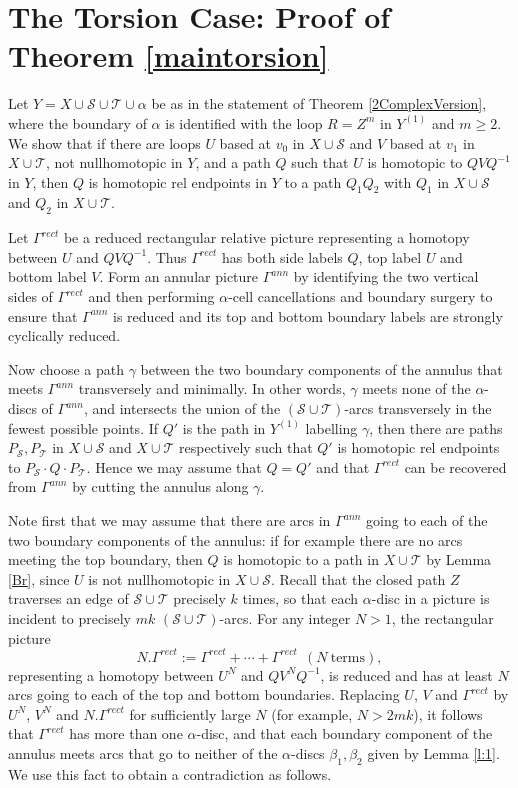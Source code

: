 \documentclass[12pt,a4paper]{amsart}
\def\G{\Gamma}
\def\a{\alpha}
\def\b{\beta}
\def\g{\gamma}
\def\cS{\mathcal{S}}
\def\cT{\mathcal{T}}
\begin{document}
\section{The Torsion Case: Proof of Theorem \ref{maintorsion}}\label{torsion}




	Let $Y=X\cup\cS\cup\cT\cup \alpha$ be as in the statement of 
 Theorem \ref{2ComplexVersion},
where the boundary of $\alpha$ is identified with the loop $R=Z^m$ in $Y^{(1)}$ and $m\ge 2$.
We show that if there are loops $U$ based at $v_0$ in $X\cup\cS$ and 
$V$ based at $v_1$ in $X\cup\cT$,
not nullhomotopic in $Y$, 
and a path $Q$ such that $U$ is homotopic to $QVQ^{-1}$ in $Y$,
then $Q$ is homotopic rel endpoints in $Y$ to a path $Q_1Q_2$ with $Q_1$ in $X\cup\cS$ and
$Q_2$ in $X\cup\cT$.

\smallskip
Let $\G^{rect}$ be a reduced rectangular relative picture representing 
a homotopy between $U$ and  $QVQ^{-1}$.  
Thus $\G^{rect}$ has both side labels $Q$, top label $U$ and bottom label $V$.   
Form an annular picture $\G^{ann}$ by identifying the two vertical sides of $\G^{rect}$ 
and then performing $\a$-cell cancellations and boundary surgery to ensure that $\G^{ann}$ is reduced 
and its top and bottom boundary labels are strongly cyclically reduced.

Now choose a path $\g$ between the two boundary components of the annulus that meets $\G^{ann}$ transversely and minimally.
In other words, $\g$ meets none of the $\a$-discs of $\G^{ann}$, and intersects the union of the $(\cS\cup\cT)$-arcs transversely in the fewest possible points.  
If $Q'$ is the path in $Y^{(1)}$ labelling $\g$, then there are paths $P_\cS,P_\cT$ in $X\cup\cS$ 
and $X\cup\cT$ respectively such that $Q'$ is homotopic rel endpoints to $P_\cS\cdot Q\cdot P_\cT$.  
 Hence we may assume that $Q=Q'$ and that $\G^{rect}$ can be recovered from $\G^{ann}$ by cutting the annulus along $\g$.

Note first that we may assume that there are arcs in $\G^{ann}$ 
going to each of the two boundary components of the annulus: if for example there are no arcs meeting the top boundary, 
then $Q$ is homotopic to a path in $X\cup\cT$ by Lemma \ref{Br}, since $U$ is not nullhomotopic in $X\cup\cS$.  
 Recall that the closed path $Z$ traverses an edge of $\cS\cup\cT$ precisely $k$ times, 
 so that each $\a$-disc in a picture is incident to  precisely $mk$ $(\cS\cup\cT)$-arcs.   
 For any integer $N>1$, the rectangular picture
$$N.\G^{rect}:=\G^{rect}+\cdots+\G^{rect}~~(N~\mathrm{terms}),$$
representing 
a homotopy between $U^N$ and  $QV^NQ^{-1}$, is reduced and has at least $N$ arcs going to each of the top and bottom boundaries.   Replacing $U$, $V$ and $\G^{rect}$ by $U^N$, $V^N$ and $N.\G^{rect}$ for sufficiently large $N$ (for example, $N>2mk$), it follows that $\G^{rect}$ has more than one $\a$-disc, and that each boundary component of the annulus meets arcs that go to neither of the $\a$-discs $\b_1,\b_2$ given by Lemma \ref{l:1}.   We use this fact to obtain a contradiction as follows.
\end{document}
